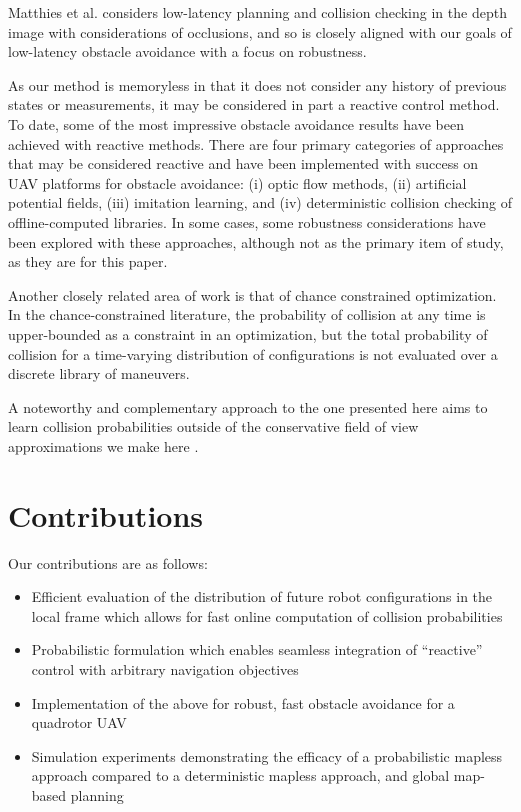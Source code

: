 \documentclass{llncs}
\begin{document}
Matthies et al. considers low-latency planning and collision checking in the depth image with considerations of occlusions, and so is closely aligned with our goals of low-latency obstacle avoidance with a focus on robustness.

As our method is memoryless in that it does not consider any history of previous states or measurements, it may be considered in part a reactive control method.  To date, some of the most impressive obstacle avoidance results have been achieved with reactive methods.  There are four primary categories of approaches that may be considered reactive and have been implemented with success on UAV platforms for obstacle avoidance: (i) optic flow methods, (ii) artificial potential fields, (iii) imitation learning, and (iv) deterministic collision checking of offline-computed libraries.  In some cases, some robustness considerations have been explored with these approaches, although not as the primary item of study, as they are for this paper.

Another closely related area of work is that of chance constrained optimization.  In the chance-constrained literature, the probability of collision at any time is upper-bounded as a constraint in an optimization, but the total probability of collision for a time-varying distribution of configurations is not evaluated over a discrete library of maneuvers.

A noteworthy and complementary approach to the one presented here aims to learn collision probabilities outside of the conservative field of view approximations we make here \cite{richter_isrr15}.
%

\section{Contributions}%
Our contributions are as follows:
%
\begin{itemize}
\item Efficient evaluation of the distribution of future robot configurations in the local frame which allows for fast online computation of collision probabilities
\item Probabilistic formulation which enables seamless integration of ``reactive'' control with arbitrary navigation objectives
\item Implementation of the above for robust, fast obstacle avoidance for a quadrotor UAV
\item Simulation experiments demonstrating the efficacy of a probabilistic mapless approach compared to a deterministic mapless approach, and global map-based planning
\end{itemize}
%
\end{document}

